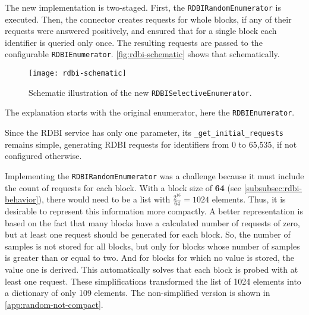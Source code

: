 The new implementation is two-staged. 
First, the \texttt{RDBIRandomEnumerator} is executed. 
Then, the connector creates requests for whole blocks, if any of their requests were answered positively, and ensured that for a single block each identifier is queried only once. The resulting requests are passed to the configurable \texttt{RDBIEnumerator}. 
\autoref{fig:rdbi-schematic} shows that schematically.

\begin{figure}[htb]
    \centering
    \texttt{[image: rdbi-schematic]}
    \caption{Schematic illustration of the new \texttt{RDBISelectiveEnumerator}.}
    \label{fig:rdbi-schematic}
\end{figure}

The explanation starts with the original enumerator, here the \texttt{RDBIEnumerator}.


Since the RDBI service has only one parameter, its \texttt{_get_initial_requests} remains simple, generating RDBI requests for identifiers from 0 to 65,535, if not configured otherwise.

Implementing the \texttt{RDBIRandomEnumerator} was a challenge because it must include the count of requests for each block. 
With a block size of \textbf{64} (see \autoref{subsubsec:rdbi-behavior}), there would need to be a list with $\frac{2^{16}}{64} = 1024$ elements. 
Thus, it is desirable to represent this information more compactly. 
A better representation is based on the fact that many blocks have a calculated number of requests of zero, but at least one request should be generated for each block. 
So, the number of samples is not stored for all blocks, but only for blocks whose number of samples is greater than or equal to two. 
And for blocks for which no value is stored, the value one is derived. This automatically solves that each block is probed with at least one request. 
These simplifications transformed the list of 1024 elements into a dictionary of only 109 elements. 
The non-simplified version is shown in \autoref{app:random-not-compact}.

